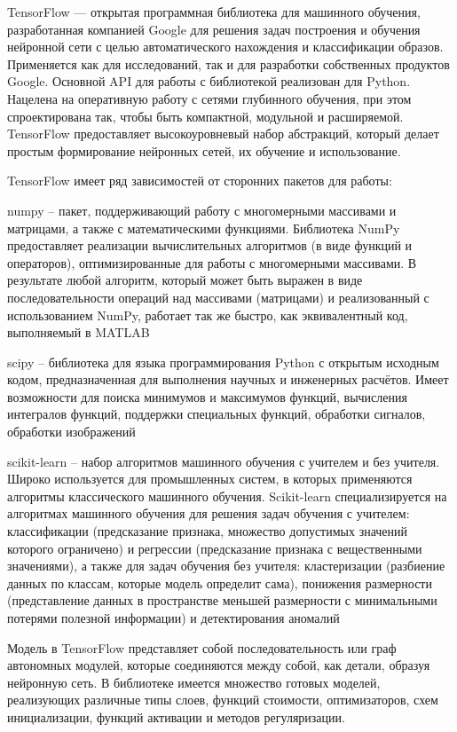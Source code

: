 TensorFlow — открытая программная библиотека для машинного обучения, разработанная компанией Google для решения задач построения и обучения нейронной сети с целью автоматического нахождения и классификации образов. Применяется как для исследований, так и для разработки собственных продуктов Google. Основной API для работы с библиотекой реализован для Python. Нацелена на оперативную работу с сетями глубинного обучения, при этом спроектирована так, чтобы быть компактной, модульной и расширяемой. TensorFlow предоставляет высокоуровневый набор абстракций, который делает простым формирование нейронных сетей, их обучение и использование.

TensorFlow имеет ряд зависимостей от сторонних пакетов для работы:
%
\begin{itemize*}
  \item numpy – пакет, поддерживающий работу с многомерными массивами и матрицами, а также с математическими функциями. Библиотека NumPy предоставляет реализации вычислительных алгоритмов (в виде функций и операторов), оптимизированные для работы с многомерными массивами. В результате любой алгоритм, который может быть выражен в виде последовательности операций над массивами (матрицами) и реализованный с использованием NumPy, работает так же быстро, как эквивалентный код, выполняемый в MATLAB
  \item scipy – библиотека для языка программирования Python с открытым исходным кодом, предназначенная для выполнения научных и инженерных расчётов. Имеет возможности для поиска минимумов и максимумов функций, вычисления интегралов функций, поддержки специальных функций, обработки сигналов, обработки изображений
  \item scikit-learn – набор алгоритмов машинного обучения с учителем и без учителя. Широко используется для промышленных систем, в которых применяются алгоритмы классического машинного обучения. Scikit-learn специализируется на алгоритмах машинного обучения для решения задач обучения с учителем: классификации (предсказание признака, множество допустимых значений которого ограничено) и регрессии (предсказание признака с вещественными значениями), а также для задач обучения без учителя: кластеризации (разбиение данных по классам, которые модель определит сама), понижения размерности (представление данных в пространстве меньшей размерности с минимальными потерями полезной информации) и детектирования аномалий  
\end{itemize*}
%

Модель в TensorFlow представляет собой последовательность или граф автономных модулей, которые соединяются между собой, как детали, образуя нейронную сеть. В библиотеке имеется множество готовых моделей, реализующих различные типы слоев, функций стоимости, оптимизаторов, схем инициализации, функций активации и методов регуляризации.

